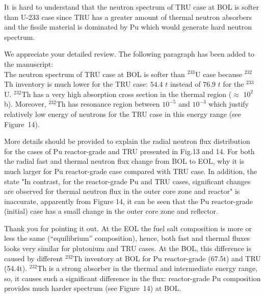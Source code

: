 \documentclass[answers,11pt]{exam}
\begin{document}
\begin{questions}
\begin{solution}
        \end{solution}

        \question It is hard to understand that the neutron spectrum of TRU case at BOL is softer than U-233 case since TRU has a greater amount of thermal neutron absorbers and the fissile material is dominated by Pu which would generate hard neutron spectrum.
        
        \begin{solution}
                 We appreciate your detailed review.                   
                 The following paragraph has been added to the manuscript:\\
                 
                 The neutron spectrum of TRU case at BOL is softer than $^{233}$U case because $^{232}$Th inventory is much lower for the TRU case: $54.4$ $t$ instead of $76.9$ $t$ for the $^{233}$U. $^{232}$Th has a very high absorption cross section in the thermal region ($\approx$ $10^2$ b). Moreover, $^{232}$Th has resonance region between $10^{-5}$ and $10^{-3}$ which justify relatively low energy of neutrons for the TRU case in this energy range (see Figure~14). 
                 
        \end{solution}

        \question More details should be provided to explain the radial 
        neutron flux distribution for the cases of Pu reactor-grade and TRU 
        presented in Fig.13 and 14. For both the radial fast and thermal 
        neutron flux change from BOL to EOL, why it is much larger for Pu 
        reactor-grade case compared with TRU case. In addition, the state "In 
        contrast, for the reactor-grade Pu and TRU cases, significant changes 
        are observed for thermal neutron flux in the outer core zone and 
        reactor" is inaccurate, apparently from Figure 14, it can be seen that 
        the Pu reactor-grade (initial) case has a small change in the outer 
        core zone and reflector. 
        \begin{solution}
				Thank you for pointing it out. 
				At the EOL the fuel salt composition is more or less the same 
				(``equilibrium'' composition), hence, both fast and thermal 
				fluxes looks very similar for plutonium and TRU cases.
				At the BOL, this difference is caused by different $^{232}$Th 
				inventory at BOL for Pu reactor-grade (67.5t) and TRU (54.4t). 
				 $^{232}$Th is a strong absorber in the thermal and 
				 intermediate energy range, so, it causes such a significant  
				 difference in the flux: reactor-grade Pu composition provides 
				 much harder spectrum (see Figure~14) at BOL.
				

\end{solution}
\end{questions}
\end{document}
